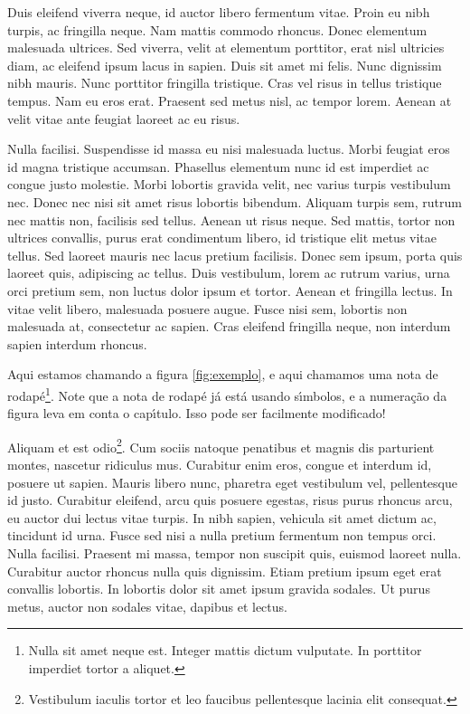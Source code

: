 Duis eleifend viverra neque, id auctor libero fermentum vitae. Proin
eu nibh turpis, ac fringilla neque. Nam mattis commodo rhoncus. Donec
elementum malesuada ultrices. Sed viverra, velit at elementum
porttitor, erat nisl ultricies diam, ac eleifend ipsum lacus in
sapien. Duis sit amet mi felis. Nunc dignissim nibh mauris. Nunc
porttitor fringilla tristique. Cras vel risus in tellus tristique
tempus. Nam eu eros erat. Praesent sed metus nisl, ac tempor
lorem. Aenean at velit vitae ante feugiat laoreet ac eu risus.

Nulla facilisi. Suspendisse id massa eu nisi malesuada luctus. Morbi
feugiat eros id magna tristique accumsan. Phasellus elementum nunc id
est imperdiet ac congue justo molestie. Morbi lobortis gravida velit,
nec varius turpis vestibulum nec. Donec nec nisi sit amet risus
lobortis bibendum. Aliquam turpis sem, rutrum nec mattis non,
facilisis sed tellus. Aenean ut risus neque. Sed mattis, tortor non
ultrices convallis, purus erat condimentum libero, id tristique elit
metus vitae tellus. Sed laoreet mauris nec lacus pretium
facilisis. Donec sem ipsum, porta quis laoreet quis, adipiscing ac
tellus. Duis vestibulum, lorem ac rutrum varius, urna orci pretium
sem, non luctus dolor ipsum et tortor. Aenean et fringilla lectus. In
vitae velit libero, malesuada posuere augue. Fusce nisi sem, lobortis
non malesuada at, consectetur ac sapien. Cras eleifend fringilla
neque, non interdum sapien interdum rhoncus.

Aqui estamos chamando a figura \ref{fig:exemplo}, e aqui chamamos uma
nota de rodap\'e\footnote{Nulla sit amet neque est. Integer mattis
  dictum vulputate. In porttitor imperdiet tortor a aliquet.}. Note
que a nota de rodap\'e j\'a est\'a usando s\'{\i}mbolos, e a
numera\c{c}\~ao da figura leva em conta o cap\'{\i}tulo. Isso pode ser
facilmente modificado!

Aliquam et est odio\footnote{Vestibulum iaculis tortor et leo faucibus
  pellentesque lacinia elit consequat.}. Cum sociis natoque penatibus
et magnis dis parturient montes, nascetur ridiculus mus. Curabitur
enim eros, congue et interdum id, posuere ut sapien. Mauris libero
nunc, pharetra eget vestibulum vel, pellentesque id justo. Curabitur
eleifend, arcu quis posuere egestas, risus purus rhoncus arcu, eu
auctor dui lectus vitae turpis. In nibh sapien, vehicula sit amet
dictum ac, tincidunt id urna. Fusce sed nisi a nulla pretium fermentum
non tempus orci. Nulla facilisi. Praesent mi massa, tempor non
suscipit quis, euismod laoreet nulla. Curabitur auctor rhoncus nulla
quis dignissim. Etiam pretium ipsum eget erat convallis lobortis. In
lobortis dolor sit amet ipsum gravida sodales. Ut purus metus, auctor
non sodales vitae, dapibus et lectus.

